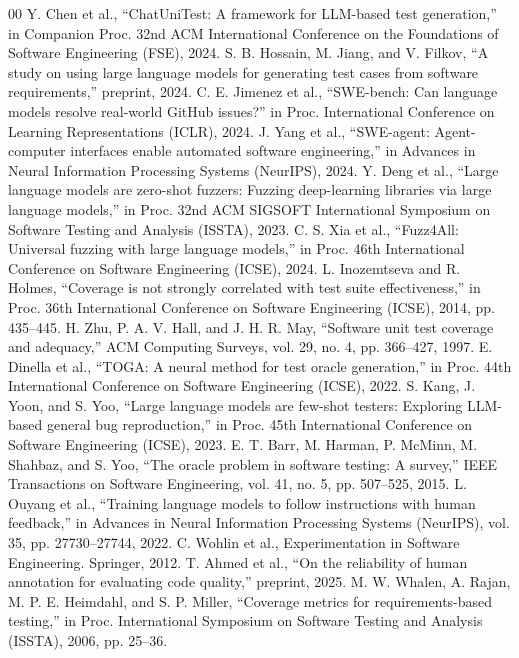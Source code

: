 \documentclass[conference]{IEEEtran}
\begin{document}
\begin{thebibliography}{00}
 Y. Chen et al., ``ChatUniTest: A framework for LLM-based test generation,'' in Companion Proc. 32nd ACM International Conference on the Foundations of Software Engineering (FSE), 2024.
 S. B. Hossain, M. Jiang, and V. Filkov, ``A study on using large language models for generating test cases from software requirements,'' preprint, 2024.
 C. E. Jimenez et al., ``SWE-bench: Can language models resolve real-world GitHub issues?'' in Proc. International Conference on Learning Representations (ICLR), 2024.
 J. Yang et al., ``SWE-agent: Agent-computer interfaces enable automated software engineering,'' in Advances in Neural Information Processing Systems (NeurIPS), 2024.
 Y. Deng et al., ``Large language models are zero-shot fuzzers: Fuzzing deep-learning libraries via large language models,'' in Proc. 32nd ACM SIGSOFT International Symposium on Software Testing and Analysis (ISSTA), 2023.
 C. S. Xia et al., ``Fuzz4All: Universal fuzzing with large language models,'' in Proc. 46th International Conference on Software Engineering (ICSE), 2024.
 L. Inozemtseva and R. Holmes, ``Coverage is not strongly correlated with test suite effectiveness,'' in Proc. 36th International Conference on Software Engineering (ICSE), 2014, pp. 435--445.
 H. Zhu, P. A. V. Hall, and J. H. R. May, ``Software unit test coverage and adequacy,'' ACM Computing Surveys, vol. 29, no. 4, pp. 366--427, 1997.
 E. Dinella et al., ``TOGA: A neural method for test oracle generation,'' in Proc. 44th International Conference on Software Engineering (ICSE), 2022.
 S. Kang, J. Yoon, and S. Yoo, ``Large language models are few-shot testers: Exploring LLM-based general bug reproduction,'' in Proc. 45th International Conference on Software Engineering (ICSE), 2023.
 E. T. Barr, M. Harman, P. McMinn, M. Shahbaz, and S. Yoo, ``The oracle problem in software testing: A survey,'' IEEE Transactions on Software Engineering, vol. 41, no. 5, pp. 507--525, 2015.
 L. Ouyang et al., ``Training language models to follow instructions with human feedback,'' in Advances in Neural Information Processing Systems (NeurIPS), vol. 35, pp. 27730--27744, 2022.
 C. Wohlin et al., Experimentation in Software Engineering. Springer, 2012.
 T. Ahmed et al., ``On the reliability of human annotation for evaluating code quality,'' preprint, 2025.
 M. W. Whalen, A. Rajan, M. P. E. Heimdahl, and S. P. Miller, ``Coverage metrics for requirements-based testing,'' in Proc. International Symposium on Software Testing and Analysis (ISSTA), 2006, pp. 25--36.
\end{thebibliography}
\end{document}
